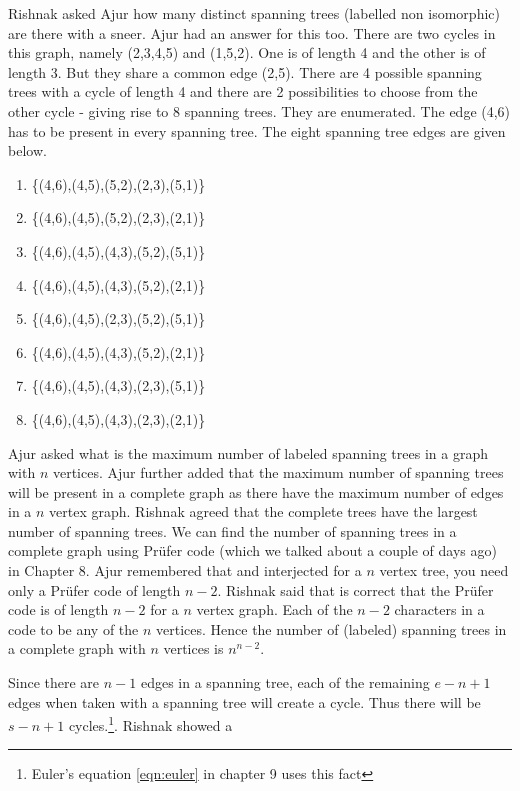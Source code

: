 Rishnak asked Ajur how many distinct spanning trees (labelled non isomorphic) are there with a sneer. Ajur had an answer for this too. There are two cycles in this graph, namely (2,3,4,5) and (1,5,2). One is of 
length 4 and the other is of length 3. But they share a common edge (2,5). There are 4 possible spanning trees with a cycle of length 4 and there are 2 possibilities to choose from the other cycle - giving rise to 8 spanning trees. They are enumerated.   
The edge (4,6) has to be present in every spanning tree. The eight spanning tree edges are given below.
\begin{enumerate}
    \item \{(4,6),(4,5),(5,2),(2,3),(5,1)\}
    \item \{(4,6),(4,5),(5,2),(2,3),(2,1)\}
    \item \{(4,6),(4,5),(4,3),(5,2),(5,1)\}
    \item \{(4,6),(4,5),(4,3),(5,2),(2,1)\}
    \item \{(4,6),(4,5),(2,3),(5,2),(5,1)\}
    \item \{(4,6),(4,5),(4,3),(5,2),(2,1)\}
    \item \{(4,6),(4,5),(4,3),(2,3),(5,1)\}
    \item \{(4,6),(4,5),(4,3),(2,3),(2,1)\}
\end{enumerate}

Ajur asked what is the maximum number of labeled spanning trees in a graph with $n$ vertices. Ajur further added that the maximum number of spanning trees will be present in a complete graph as there have the maximum number of edges in a $n$ vertex graph. Rishnak agreed that the complete trees have the largest number of spanning trees. We can find the number of spanning trees in a complete graph using Pr{\"u}fer code (which we talked about a couple of days ago) in Chapter 8. Ajur remembered that and interjected for a $n$ vertex tree, you need only a Pr{\"u}fer code of length $n-2$. Rishnak said that is correct that the Pr{\"u}fer code is of length $n-2$ for a $n$ vertex graph. Each of the $n-2$ characters in a code to be any of the $n$ vertices. Hence the number of (labeled) spanning trees in a complete graph with $n$ vertices is $n^{n-2}$.

Since there are $n-1$ edges in a spanning tree, each of the remaining $e-n+1$ edges when taken with a spanning tree will create a cycle. Thus there will be $s-n+1$ cycles.\footnote{Euler's equation \ref{eqn:euler} in chapter 9 uses this fact}. Rishnak showed a 